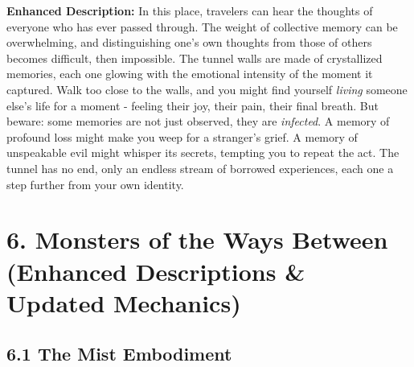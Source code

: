 \documentclass[11pt]{article}
\begin{document}
\textbf{Enhanced Description:} In this place, travelers can hear the thoughts of everyone who has ever passed through. The weight of collective memory can be overwhelming, and distinguishing one's own thoughts from those of others becomes difficult, then impossible. The tunnel walls are made of crystallized memories, each one glowing with the emotional intensity of the moment it captured. Walk too close to the walls, and you might find yourself \textit{living} someone else's life for a moment - feeling their joy, their pain, their final breath. But beware: some memories are not just observed, they are \textit{infected}. A memory of profound loss might make you weep for a stranger's grief. A memory of unspeakable evil might whisper its secrets, tempting you to repeat the act. The tunnel has no end, only an endless stream of borrowed experiences, each one a step further from your own identity.

\clearpage

\section*{6. Monsters of the Ways Between (Enhanced Descriptions \& Updated Mechanics)}

\subsection*{6.1 The Mist Embodiment}
\end{document}
